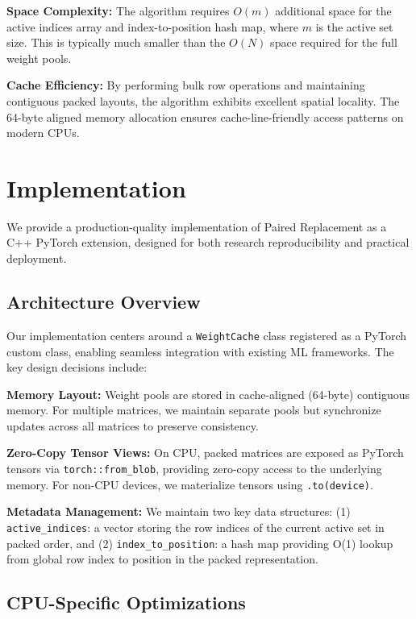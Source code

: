 \documentclass{article}
\numberwithin{equation}{section}
\theoremstyle{plain}
\theoremstyle{definition}
\theoremstyle{remark}
\begin{document}
\textbf{Space Complexity:} The algorithm requires $O(m)$ additional space for the active indices array and index-to-position hash map, where $m$ is the active set size. This is typically much smaller than the $O(N)$ space required for the full weight pools.

\textbf{Cache Efficiency:} By performing bulk row operations and maintaining contiguous packed layouts, the algorithm exhibits excellent spatial locality. The 64-byte aligned memory allocation ensures cache-line-friendly access patterns on modern CPUs.

\section{Implementation} \label{sec:implementation}

We provide a production-quality implementation of Paired Replacement as a C++ PyTorch extension, designed for both research reproducibility and practical deployment.

\subsection{Architecture Overview}

Our implementation centers around a \texttt{WeightCache} class registered as a PyTorch custom class, enabling seamless integration with existing ML frameworks. The key design decisions include:

\textbf{Memory Layout:} Weight pools are stored in cache-aligned (64-byte) contiguous memory. For multiple matrices, we maintain separate pools but synchronize updates across all matrices to preserve consistency.

\textbf{Zero-Copy Tensor Views:} On CPU, packed matrices are exposed as PyTorch tensors via \texttt{torch::from\_blob}, providing zero-copy access to the underlying memory. For non-CPU devices, we materialize tensors using \texttt{.to(device)}.

\textbf{Metadata Management:} We maintain two key data structures: (1) \texttt{active\_indices}: a vector storing the row indices of the current active set in packed order, and (2) \texttt{index\_to\_position}: a hash map providing O(1) lookup from global row index to position in the packed representation.

\subsection{CPU-Specific Optimizations}
\end{document}
